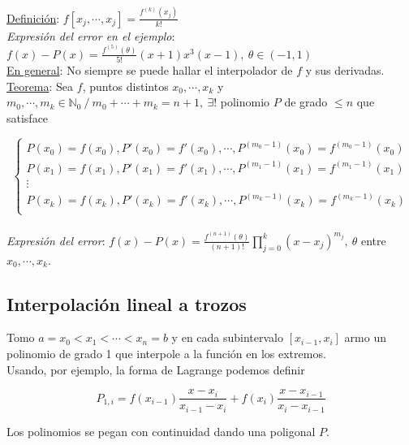 \underline{Definici\'on}: $f[x_{j}, \cdots, x_{j}] = \frac{f^{(k)}(x_{j})}{k!}$\\

\textit{Expresi\'on del error en el ejemplo}: $f(x) - P(x) = \frac{f^{(5)}(\theta)}{5!}(x + 1)x^{3}(x - 1),\ \theta \in (-1, 1)$\\

\underline{En general}: No siempre se puede hallar el interpolador de $f$ y sus derivadas.\\

\underline{Teorema}: Sea $f$, puntos distintos $x_{0}, \cdots, x_{k}$ y $m_{0}, \cdots, m_{k} \in \mathbb{N}_{0}\ / \ m_{0} + \cdots + m_{k} = n + 1,\ \exists!$ polinomio $P$ de grado $\leq n$ que satisface

$$
	\begin{cases}
     	P(x_{0}) = f(x_{0}), P'(x_{0}) = f'(x_{0}), \cdots, P^{(m_{0} - 1)}(x_{0}) = f^{(m_{0} - 1)}(x_{0})\\
		P(x_{1}) = f(x_{1}), P'(x_{1}) = f'(x_{1}), \cdots, P^{(m_{1} - 1)}(x_{1}) = f^{(m_{1} - 1)}(x_{1})\\
		\vdots\\
        P(x_{k}) = f(x_{k}), P'(x_{k}) = f'(x_{k}), \cdots, P^{(m_{k} - 1)}(x_{k}) = f^{(m_{k} - 1)}(x_{k})\\ 
    \end{cases}
$$\\

\textit{Expresi\'on del error}: $f(x) - P(x) = \frac{f^{(n + 1)}(\theta)}{(n + 1)!}\prod \limits_{j = 0}^{k}(x - x_{j})^{m_{j}},\ \theta$ entre $x_{0}, \cdots, x_{k}$.\\

\subsection{Interpolaci\'on lineal a trozos}

Tomo $a = x_{0} < x_{1} < \cdots < x_{n} = b$ y en cada subintervalo $[x_{i - 1}, x_{i}]$ armo un polinomio de grado 1 que interpole a la funci\'on en los extremos.\\

Usando, por ejemplo, la forma de Lagrange podemos definir

$$P_{1, i} = f(x_{i - 1})\frac{x - x_{i}}{x_{i - 1} - x_{i}} + f(x_{i})\frac{x - x_{i - 1}}{x_{i} - x_{i - 1}}$$

Los polinomios se pegan con continuidad dando una poligonal $P$.\\

